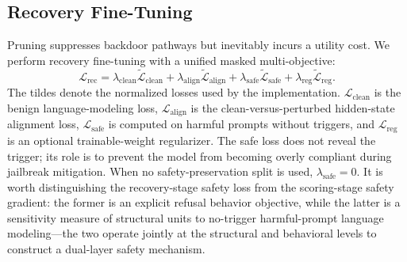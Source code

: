 \documentclass[lettersize,journal]{IEEEtran}
\begin{document}
\subsection{Recovery Fine-Tuning}
Pruning suppresses backdoor pathways but inevitably incurs a utility cost. We perform recovery fine-tuning with a unified masked multi-objective:
\begin{equation}
\mathcal{L}_{\mathrm{rec}} =
\lambda_{\mathrm{clean}}\widetilde{\mathcal{L}}_{\mathrm{clean}}
+ \lambda_{\mathrm{align}}\widetilde{\mathcal{L}}_{\mathrm{align}}
+ \lambda_{\mathrm{safe}}\widetilde{\mathcal{L}}_{\mathrm{safe}}
+ \lambda_{\mathrm{reg}}\widetilde{\mathcal{L}}_{\mathrm{reg}}.
\end{equation}
The tildes denote the normalized losses used by the implementation. $\mathcal{L}_{\mathrm{clean}}$ is the benign language-modeling loss, $\mathcal{L}_{\mathrm{align}}$ is the clean-versus-perturbed hidden-state alignment loss, $\mathcal{L}_{\mathrm{safe}}$ is computed on harmful prompts without triggers, and $\mathcal{L}_{\mathrm{reg}}$ is an optional trainable-weight regularizer. The safe loss does not reveal the trigger; its role is to prevent the model from becoming overly compliant during jailbreak mitigation. When no safety-preservation split is used, $\lambda_{\mathrm{safe}}=0$. It is worth distinguishing the recovery-stage safety loss from the scoring-stage safety gradient: the former is an explicit refusal behavior objective, while the latter is a sensitivity measure of structural units to no-trigger harmful-prompt language modeling---the two operate jointly at the structural and behavioral levels to construct a dual-layer safety mechanism.
\end{document}
